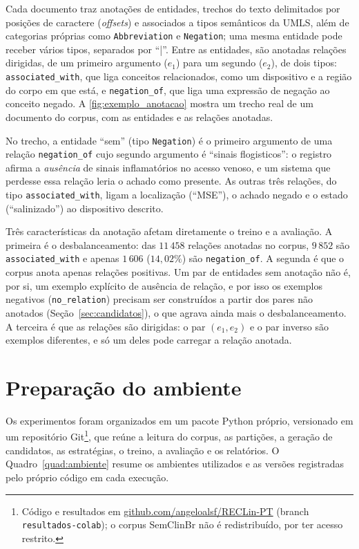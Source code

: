 Cada documento traz anotações de entidades, trechos do texto delimitados
por posições de caractere (\emph{offsets}) e associados a tipos semânticos da UMLS,
além de categorias próprias como \texttt{Abbreviation} e \texttt{Negation}; uma
mesma entidade pode receber vários tipos, separados por ``|''. Entre as entidades,
são anotadas relações dirigidas, de um primeiro argumento ($e_1$) para um
segundo ($e_2$), de dois tipos: \texttt{associated\_with}, que liga conceitos
relacionados, como um dispositivo e a região do corpo em que está, e
\texttt{negation\_of}, que liga uma expressão de negação ao conceito negado. A
\autoref{fig:exemplo_anotacao} mostra um trecho real de um documento do corpus, com
as entidades e as relações anotadas.



No trecho, a entidade ``sem'' (tipo \texttt{Negation}) é o primeiro argumento de uma
relação \texttt{negation\_of} cujo segundo argumento é ``sinais flogisticos'': o
registro afirma a \emph{ausência} de sinais inflamatórios no acesso venoso, e um
sistema que perdesse essa relação leria o achado como presente. As outras três
relações, do tipo \texttt{associated\_with}, ligam a localização (``MSE''), o achado
negado e o estado (``salinizado'') ao dispositivo descrito.

Três características da anotação afetam diretamente o treino e a avaliação. A
primeira é o desbalanceamento: das $11\,458$ relações anotadas no corpus,
$9\,852$ são \texttt{associated\_with} e apenas $1\,606$ ($14{,}02\%$) são
\texttt{negation\_of}. A segunda é que o corpus anota apenas relações
positivas. Um par de entidades sem anotação não é, por si, um exemplo explícito de
ausência de relação, e por isso os exemplos negativos (\texttt{no\_relation}) precisam
ser construídos a partir dos pares não anotados (Seção~\ref{sec:candidatos}), o que
agrava ainda mais o desbalanceamento. A terceira é que as relações são
dirigidas: o par $(e_1, e_2)$ e o par inverso são exemplos diferentes, e só um deles
pode carregar a relação anotada.

\section{Preparação do ambiente}
\label{sec:ambiente}

Os experimentos foram organizados em um pacote Python próprio, versionado em um
repositório Git\footnote{Código e resultados em
\href{https://github.com/angeloalsf/RECLin-PT}{github.com/angeloalsf/RECLin-PT}
(branch \texttt{resultados-colab}); o corpus SemClinBr não é redistribuído, por ter
acesso restrito.}, que reúne a leitura do corpus, as partições, a geração de
candidatos, as estratégias, o treino, a avaliação e os relatórios. O
Quadro~\ref{quad:ambiente} resume os ambientes utilizados e as versões registradas
pelo próprio código em cada execução.

